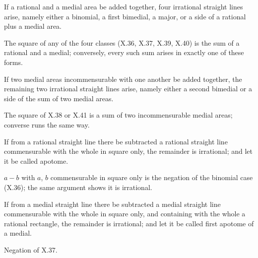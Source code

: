 \begin{claim}
\label{prop:X.71}
If a rational and a medial area be added together, four irrational
straight lines arise, namely either a binomial, a first bimedial, a
major, or a side of a rational plus a medial area.
\end{claim}
\begin{evidence}[Proof of X.71]
\label{ev:X.71}
The square of any of the four classes (X.36, X.37, X.39, X.40) is
the sum of a rational and a medial; conversely, every such sum
arises in exactly one of these forms.
\end{evidence}

\begin{claim}
\label{prop:X.72}
If two medial areas incommensurable with one another be added
together, the remaining two irrational straight lines arise, namely
either a second bimedial or a side of the sum of two medial areas.
\end{claim}
\begin{evidence}[Proof of X.72]
\label{ev:X.72}
The square of X.38 or X.41 is a sum of two incommensurable medial
areas; converse runs the same way.
\end{evidence}

\begin{claim}
\label{prop:X.73}
If from a rational straight line there be subtracted a rational
straight line commensurable with the whole in square only, the
remainder is irrational; and let it be called apotome.
\end{claim}
\begin{evidence}[Proof of X.73]
\label{ev:X.73}
$a - b$ with $a$, $b$ commensurable in square only is the negation
of the binomial case (X.36); the same argument shows it is
irrational.
\end{evidence}

\begin{claim}
\label{prop:X.74}
If from a medial straight line there be subtracted a medial straight
line commensurable with the whole in square only, and containing
with the whole a rational rectangle, the remainder is irrational;
and let it be called first apotome of a medial.
\end{claim}
\begin{evidence}[Proof of X.74]
\label{ev:X.74}
Negation of X.37.
\end{evidence}

